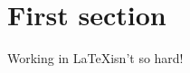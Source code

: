 \documentclass{article}
\begin{document}


\section*{First section}
Working in \LaTeX isn't so hard!
\end{document}
